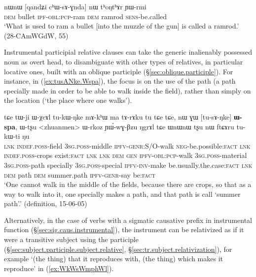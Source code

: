 \begin{exe}
\ex \label{ex:qandZi.chWsAGnda}
\gll nɯnɯ [qandʑi cʰɯ-sɤ-ɣnda] nɯ tʰoŋtʰɤr ɲɯ-rmi \\
\textsc{dem} bullet \textsc{ipf}-\textsc{obl}:\textsc{pcp}-ram \textsc{dem} ramrod \textsc{sens}-be.called \\
 \glt `What is used to ram a bullet [into the muzzle of the gun] is called a ramrod.' (28-CAmWGdW, 55)
\end{exe} 
 
 Instrumental participial relative clauses can take the generic inalienably possessed noun  as overt head, to disambiguate with other types of relatives, in particular locative ones, built with an oblique participle (§\ref{sec:oblique.participle}). For instance, in (\ref{ex:tusANke.Wspa}), the focus is on the use of the path (a path specially made in order to be able to walk inside the field), rather than simply on the location (`the place where one walks').

\begin{exe}
\ex \label{ex:tusANke.Wspa}
\gll tɕe tɯ-ji ɯ-χcɤl tu-kɯ-ŋke mɤ-kʰɯ ma tɤ-rɤku tu tɕe tɕe, nɯ ɣɯ [tu-sɤ-ŋke] \textbf{ɯ-spa}, ɯ-tʂu <zhuanmen> ɯ-rkoz ɲɯ́-wɣ-βzu ŋgrɤl tɕe ɯnɯnɯ tʂu nɯ ftɕɤru tu-kɯ-ti ŋu \\
\textsc{lnk} \textsc{indef}.\textsc{poss}-field \textsc{3sg}.\textsc{poss}-middle \textsc{ipfv}-\textsc{genr}:S/O-walk \textsc{neg}-be.possible:\textsc{fact} \textsc{lnk} \textsc{indef}.\textsc{poss}-crops exist:\textsc{fact} \textsc{lnk} \textsc{lnk} \textsc{dem} \textsc{gen} \textsc{ipfv}-\textsc{obl}:\textsc{pcp}-walk \textsc{3sg}.\textsc{poss}-material \textsc{3sg}.\textsc{poss}-path specially \textsc{3sg}.\textsc{poss}-special \textsc{ipfv}-\textsc{inv}-make be.usually.the.case:\textsc{fact} \textsc{lnk} \textsc{dem} path \textsc{dem} summer.path \textsc{ipfv}-\textsc{genr}-say be:\textsc{fact} \\
\glt `One cannot walk in the middle of the fields, because there are crops, so that as a way to walk into it, one specially makes a path, and that path is call `summer path'.' (definition, 15-06-05)
\end{exe} 

Alternatively, in the case of verbs with a sigmatic causative prefix in instrumental function (§\ref{sec:sig.caus.instrumental}), the instrument can be relativized as if it were a transitive subject using the  participle (§\ref{sec:subject.participle.subject.relative}, §\ref{sec:tr.subject.relativization}), for example  `(the thing) that it reproduces with, (the thing) which makes it reproduce' in (\ref{ex:WkWsWmphWl}).

